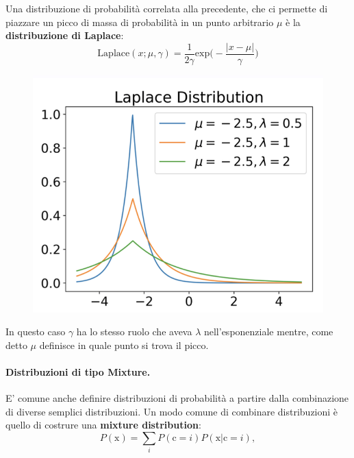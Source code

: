 Una distribuzione di probabilità correlata alla precedente, che ci permette di piazzare un picco di massa di probabilità in un punto arbitrario $\mu$ è la \textbf{distribuzione di Laplace}:
\begin{equation}
    \text{Laplace}(x;\mu,\gamma)=\frac{1}{2\gamma}\text{exp}\Big(-\frac{|x-\mu|}{\gamma} \Big)
\end{equation}
\begin{figure}[!h]
    \includegraphics[scale=.7]{images/prerequisites/laplace.png}
    \centering
\end{figure}



In questo caso $\gamma$ ha lo stesso ruolo che aveva $\lambda$ nell'esponenziale mentre, come detto $\mu$ definisce in quale punto si trova il picco.
\newpage
\paragraph{Distribuzioni di tipo Mixture.} E' comune anche definire distribuzioni di probabilità a partire dalla combinazione di diverse semplici distribuzioni. Un modo comune di combinare distribuzioni è quello di costrure una \textbf{mixture distribution}:
\begin{equation}
    P(\text{x})=\sum_iP(\text{c}=i)P(\text{x|c}=i),
\end{equation}



